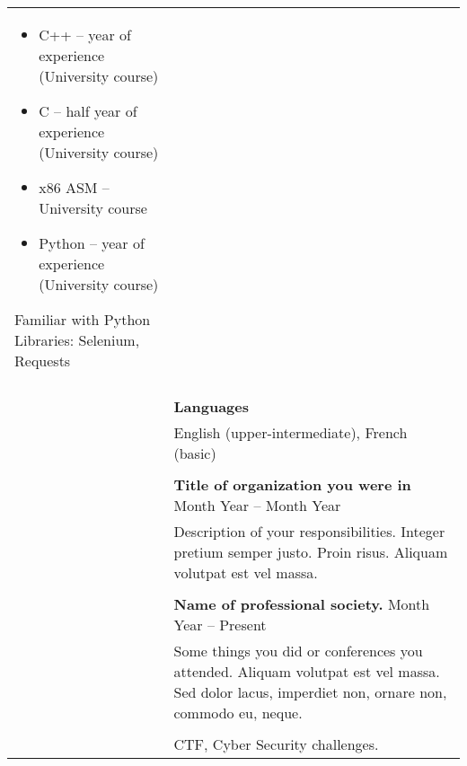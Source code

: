 \documentclass[letterpaper, 11pt]{article}
\begin{document}
\begin{longtable}{p{1.3in}p{4.8in}}
\begin{itemize}[noitemsep, leftmargin=*]
    \item C++ -- year of experience (University course)
    \item C -- half year of experience (University course)
    \item x86 ASM -- University course
    \item Python -- year of experience (University course)
\end{itemize}
Familiar with Python Libraries: Selenium, Requests\\
& \\

& \textbf{Languages} \\
& English (upper-intermediate), French (basic) \\
& \\


\color{OliveGreen}{Service and outreach}
& \textbf{Title of organization you were in} \hfill Month Year -- Month Year \\
& Description of your responsibilities. Integer pretium semper justo. Proin risus. Aliquam volutpat est vel massa. \\
& \\


{\color{OliveGreen}{Professional}} 
& {\textbf{Name of professional society.}} \hfill Month Year -- Present \\
{\color{OliveGreen}{memberships}} 
& Some things you did or conferences you attended. Aliquam volutpat est vel massa. Sed dolor lacus, imperdiet non, ornare non, commodo eu, neque. \\
& \\


\nohyphens{\color{OliveGreen}{Other interests}} & CTF, Cyber Security challenges.\\


\end{longtable}
\end{document}
